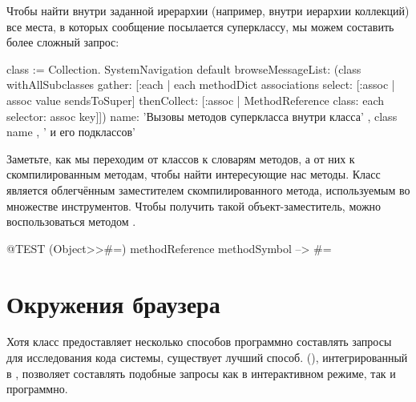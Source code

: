 \documentclass[a4paper,10pt,twoside]{book}
\begin{document}
Чтобы найти внутри заданной ирерархии (например, внутри иерархии коллекций) все места, в которых сообщение посылается суперклассу, мы можем составить более сложный запрос:
\begin{code}{}
class := Collection.
SystemNavigation default
  browseMessageList: (class withAllSubclasses gather: [:each |
    each methodDict associations
      select: [:assoc | assoc value sendsToSuper]
      thenCollect: [:assoc | MethodReference class: each selector: assoc key]])
  name: 'Вызовы методов суперкласса внутри класса' , class name , ' и его подклассов'
\end{code}
Заметьте, как мы переходим от классов к словарям методов, а от них к скомпилированным методам, чтобы найти интересующие нас методы.
Класс  является облегчённым заместителем скомпилированного метода, используемым во множестве инструментов.
Чтобы получить такой объект-заместитель, можно воспользоваться методом .
\begin{code}{@TEST}
(Object>>#=) methodReference methodSymbol --> #=
\end{code}

\section{Окружения браузера}

Хотя класс  предоставляет несколько способов программно составлять запросы для исследования кода системы, существует лучший способ.  (), интегрированный в \pharo, позволяет составлять подобные запросы как в интерактивном режиме, так и программно.
\end{document}

